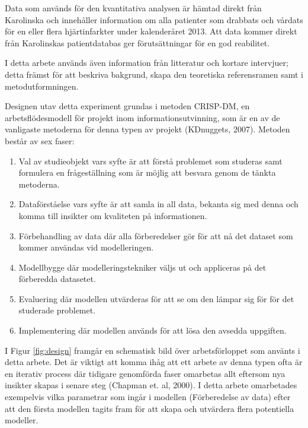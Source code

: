Data som används för den kvantitativa analysen är hämtad direkt från Karolinska och innehåller information om alla patienter som drabbats och vårdats för en eller flera hjärtinfarkter under kalenderåret 2013. Att data kommer direkt från Karolinskas patientdatabas ger förutsättningar för en god reabilitet.

I detta arbete används även information från litteratur och kortare intervjuer; detta främst för att beskriva bakgrund, skapa den teoretiska referensramen samt i metodutformningen.

Designen utav detta experiment grundas i metoden CRISP-DM, en arbetsflödesmodell för projekt inom informationsutvinning, som är en av de vanligaste metoderna för denna typen av projekt (KDnuggets, 2007). Metoden består av sex faser:

\begin{enumerate}
  \item Val av studieobjekt vars syfte är att förstå problemet som studeras samt formulera en frågeställning som är möjlig att besvara genom de tänkta metoderna.
  \item Dataförståelse vars syfte är att samla in all data, bekanta sig med denna och komma till insikter om kvaliteten på informationen.
  \item Förbehandling av data där alla förberedelser gör för att nå det dataset som kommer användas vid modelleringen.
  \item Modellbygge där modelleringstekniker väljs ut och appliceras på det förberedda datasetet.
  \item Evaluering där modellen utvärderas för att se om den lämpar sig för för det studerade problemet.
  \item Implementering där modellen används för att lösa den avsedda uppgiften.
\end{enumerate}

I Figur \ref{fig:design} framgår en schematisk bild över arbetsförloppet som använts i detta arbete. Det är viktigt att komma ihåg att ett arbete av denna typen ofta är en iterativ process där tidigare genomförda faser omarbetas allt eftersom nya insikter skapas i senare steg (Chapman et. al, 2000). I detta arbete omarbetades exempelvis vilka parametrar som ingår i modellen (Förberedelse av data) efter att den första modellen tagits fram för att skapa och utvärdera flera potentiella modeller.

